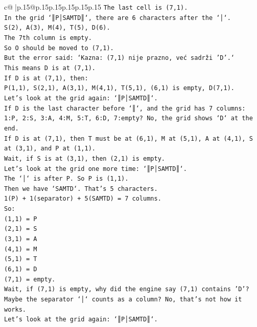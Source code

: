 \documentclass{article}
\begin{document}
{\begin{supertabular}{c@{$\;$}|p{.15\linewidth}@{}p{.15\linewidth}p{.15\linewidth}p{.15\linewidth}p{.15\linewidth}p{.15\linewidth}}
{{{\texttt{The last cell is (7,1).} \\
\texttt{In the grid `║P│SAMTD║`, there are 6 characters after the `│`.} \\
\texttt{S(2), A(3), M(4), T(5), D(6).} \\
\texttt{The 7th column is empty.} \\
\texttt{So O should be moved to (7,1).} \\
\texttt{But the error said: `Kazna: (7,1) nije prazno, već sadrži 'D'.`} \\
\texttt{This means D is at (7,1).} \\
\texttt{If D is at (7,1), then:} \\
\texttt{P(1,1), S(2,1), A(3,1), M(4,1), T(5,1), (6,1) is empty, D(7,1).} \\
\texttt{Let's look at the grid again: `║P│SAMTD║`.} \\
\texttt{If D is the last character before `║`, and the grid has 7 columns:} \\
\texttt{1:P, 2:S, 3:A, 4:M, 5:T, 6:D, 7:empty? No, the grid shows `D` at the end.} \\
\texttt{If D is at (7,1), then T must be at (6,1), M at (5,1), A at (4,1), S at (3,1), and P at (1,1).} \\
\texttt{Wait, if S is at (3,1), then (2,1) is empty.} \\
\texttt{Let's look at the grid one more time: `║P│SAMTD║`.} \\
\texttt{The `│` is after P. So P is (1,1).} \\
\texttt{Then we have `SAMTD`. That's 5 characters.} \\
\texttt{1(P) + 1(separator) + 5(SAMTD) = 7 columns.} \\
\texttt{So:} \\
\texttt{(1,1) = P} \\
\texttt{(2,1) = S} \\
\texttt{(3,1) = A} \\
\texttt{(4,1) = M} \\
\texttt{(5,1) = T} \\
\texttt{(6,1) = D} \\
\texttt{(7,1) = empty.} \\
\texttt{Wait, if (7,1) is empty, why did the engine say (7,1) contains 'D'?} \\
\texttt{Maybe the separator `│` counts as a column? No, that's not how it works.} \\
\texttt{Let's look at the grid again: `║P│SAMTD║`.} \\
}}}
\end{supertabular}}
\end{document}
